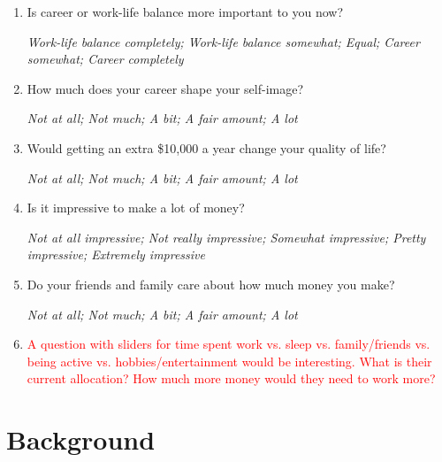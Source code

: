 \documentclass[11pt, headsepline]{article}
\newcommand{\red}[1]{\textcolor{red}{#1}}
\begin{document}
\begin{enumerate}[resume]
    \item Is career or work-life balance more important to you now?

    \textit{Work-life balance completely; Work-life balance somewhat; Equal; Career somewhat; Career completely}

    \item How much does your career shape your self-image?
    
    \textit{Not at all; Not much; A bit; A fair amount; A lot}

    \item Would getting an extra \$10,000 a year change your quality of life?

    \textit{Not at all; Not much; A bit; A fair amount; A lot}



    \item Is it impressive to make a lot of money?

    \textit{Not at all impressive; Not really impressive; Somewhat impressive; Pretty impressive; Extremely impressive}

    \item Do your friends and family care about how much money you make?

    \textit{Not at all; Not much; A bit; A fair amount; A lot}

    \item \label{item:time_slider} \red{A question with sliders for time spent work vs. sleep vs. family/friends vs. being active vs. hobbies/entertainment would be interesting. What is their current allocation? How much more money would they need to work more?}
\end{enumerate}

\section{Background}
\end{document}
